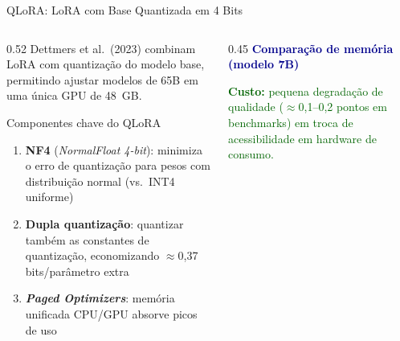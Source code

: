 \documentclass[aspectratio=169, xcolor=dvipsnames]{beamer}
\begin{document}
  \begin{frame}{QLoRA: LoRA com Base Quantizada em 4 Bits \cite{dettmers2023qlora}}
    \begin{columns}
      \begin{column}{0.52\textwidth}
        Dettmers et al.\ (2023) combinam LoRA com quantização do modelo base,
        permitindo ajustar modelos de 65B em uma única GPU de 48~GB.

        \begin{block}{Componentes chave do QLoRA}
          \begin{enumerate}
            \item \textbf{NF4} (\textit{NormalFloat 4-bit}): minimiza o erro
              de quantização para pesos com distribuição normal (vs.\ INT4 uniforme)
            \item \textbf{Dupla quantização}: quantizar também as constantes
              de quantização, economizando $\approx$0,37 bits/parâmetro extra
            \item \textbf{\textit{Paged Optimizers}}: memória unificada CPU/GPU absorve picos de uso
          \end{enumerate}
        \end{block}
      \end{column}
      \begin{column}{0.45\textwidth}
        \textcolor{DarkBlue}{\textbf{Comparação de memória (modelo 7B)}}
        \vspace{0.3em}


        \vspace{0.4em}
        \textcolor{DarkGreen}{\small \textbf{Custo:} pequena degradação de
        qualidade ($\approx$0,1--0,2 pontos em benchmarks) em troca de
        acessibilidade em hardware de consumo.}


\end{column}
\end{columns}
\end{frame}
\end{document}
